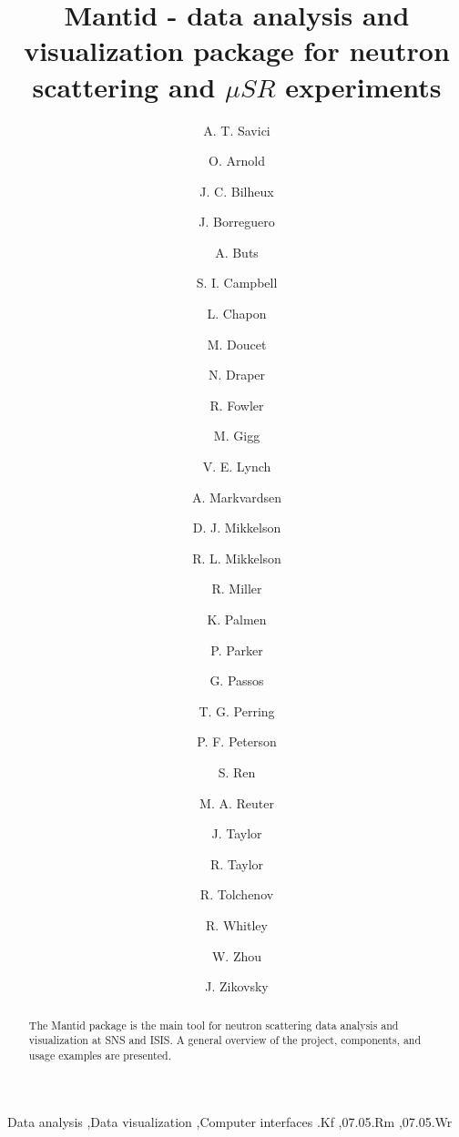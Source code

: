 \documentclass{elsarticle}
\begin{document}
\begin{frontmatter}



\title{Mantid - data analysis and visualization package for neutron scattering and $\mu SR$ experiments}


\author[ornl]{A. T. Savici}
\author[tessella]{O. Arnold}
\author[ornl]{J. C. Bilheux}
\author[ornl]{J. Borreguero}
\author[isis]{A. Buts}
\author[ornl]{S. I. Campbell}
\author[ill]{L. Chapon}
\author[ornl]{M. Doucet}
\author[tessella]{N. Draper}
\author[isis]{R. Fowler}
\author[tessella]{M. Gigg}
\author[ornl]{V. E. Lynch}
\author[isis]{A. Markvardsen}
\author[ornl,uws]{D. J. Mikkelson}
\author[ornl,uws]{R. L. Mikkelson}
\author[ornl]{R. Miller}
\author[isis]{K. Palmen}
\author[isis]{P. Parker}
\author[isis]{G. Passos}
\author[isis]{T. G. Perring}
\author[ornl]{P. F. Peterson}
\author[ornl]{S. Ren}
\author[ornl]{M. A. Reuter}
\author[isis]{J. Taylor}
\author[tessellaUS]{R. Taylor}
\author[tessella]{R. Tolchenov}
\author[isis]{R. Whitley}
\author[ornl]{W. Zhou}
\author[ornl]{J. Zikovsky}

\address[ornl]{Neutron Data Analysis and Visualization, Oak Ridge National Laboratory, Oak Ridge, TN, USA}
\address[tessella]{Tessella plc., Abingdon, Oxfordshire, UK}
\address[isis]{ISIS Facility, Rutherford Appleton Laboratory, Chilton, Didcot, Oxfordshire, UK}
\address[ill]{Institut Laue-Langevin, Grenoble, France}
\address[uws]{University of Wisconsin-Stout, Menomonie, WI, USA}
\address[tessella]{Tessella, US}

\begin{abstract}
The Mantid  package is the main tool for neutron scattering data analysis and visualization at SNS and ISIS. A general overview of the project, components, and usage examples are presented. 
\end{abstract}

\begin{keyword}
Data analysis \sep Data visualization \sep Computer interfaces
.Kf 	%
\sep 07.05.Rm 	%
\sep 07.05.Wr 	%
\end{keyword}
\end{frontmatter}
\end{document}
